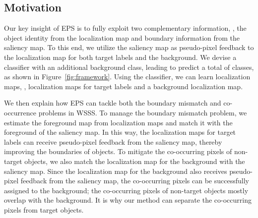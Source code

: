 \documentclass[final]{cvpr}
\begin{document}
\subsection{Motivation}
\label{section3.1}


Our key insight of EPS is to fully exploit two complementary information, \ie, the object identity from the localization map and boundary information from the saliency map. To this end, we utilize the saliency map as pseudo-pixel feedback to the localization map for both target labels and the background. We devise a classifier with an additional background class, leading to predict a total of  classes, as shown in Figure~\ref{fig:framework}. Using the classifier, we can learn  localization maps, \ie,  localization maps for target labels and a background localization map.


We then explain how EPS can tackle both the boundary mismatch and co-occurrence problems in WSSS. To manage the boundary mismatch problem, we estimate the foreground map from  localization maps and match it with the foreground of the saliency map. In this way, the localization maps for target labels can receive pseudo-pixel feedback from the saliency map, thereby improving the boundaries of objects. To mitigate the co-occurring pixels of non-target objects, we also match the localization map for the background with the saliency map. Since the localization map for the background also receives pseudo-pixel feedback from the saliency map, the co-occurring pixels can be successfully assigned to the background; the co-occurring pixels of non-target objects mostly overlap with the background. It is why our method can separate the co-occurring pixels from target objects. 
\end{document}
